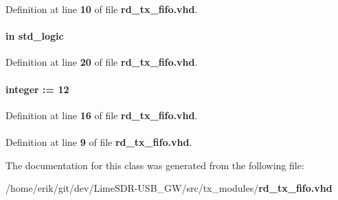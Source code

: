 Definition at line {\bf 10} of file {\bf rd\+\_\+tx\+\_\+fifo.\+vhd}.

\paragraph[{reset\+\_\+n}]{ {\bfseries \textcolor{keywordflow}{in}\textcolor{vhdlchar}{ }} {\bfseries \textcolor{comment}{std\+\_\+logic}\textcolor{vhdlchar}{ }} \hspace{0.3cm}{\ttfamily [Port]}}\label{classrd__tx__fifo_a446ea52ed8c4a84181a47d9165ce41a5}


Definition at line {\bf 20} of file {\bf rd\+\_\+tx\+\_\+fifo.\+vhd}.

\paragraph[{sampl\+\_\+width}]{ {\bfseries \textcolor{vhdlchar}{ }} {\bfseries \textcolor{comment}{integer}\textcolor{vhdlchar}{ }\textcolor{vhdlchar}{ }\textcolor{vhdlchar}{\+:}\textcolor{vhdlchar}{=}\textcolor{vhdlchar}{ }\textcolor{vhdlchar}{ } \textcolor{vhdldigit}{12} \textcolor{vhdlchar}{ }} \hspace{0.3cm}{\ttfamily [Generic]}}\label{classrd__tx__fifo_a5bd128d9c64f1e545c946fef4c8692dd}


Definition at line {\bf 16} of file {\bf rd\+\_\+tx\+\_\+fifo.\+vhd}.

\paragraph[{std\+\_\+logic\+\_\+1164}]{\hspace{0.3cm}{\ttfamily [Package]}}\label{classrd__tx__fifo_acd03516902501cd1c7296a98e22c6fcb}


Definition at line {\bf 9} of file {\bf rd\+\_\+tx\+\_\+fifo.\+vhd}.



The documentation for this class was generated from the following file\+:\begin{DoxyCompactItemize}
\item 
/home/erik/git/dev/\+Lime\+S\+D\+R-\/\+U\+S\+B\+\_\+\+G\+W/src/tx\+\_\+modules/{\bf rd\+\_\+tx\+\_\+fifo.\+vhd}\end{DoxyCompactItemize}
